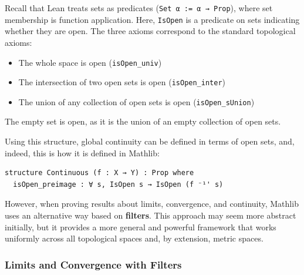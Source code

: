 Recall that Lean treats sets as predicates
(\lstinline[language=lean]|Set α := α → Prop|),
where set membership is function application.
Here, \lstinline[language=lean]|IsOpen| is a predicate on sets indicating whether
they are open. The three axioms correspond to the standard topological axioms:
\begin{itemize}
    \item The whole space is open (\lstinline[language=lean]|isOpen_univ|)
    \item The intersection of two open sets is open (\lstinline[language=lean]|isOpen_inter|)
    \item The union of any collection of open sets is open (\lstinline[language=lean]|isOpen_sUnion|)
\end{itemize}
\begin{note}
    The empty set is open, as it is the union of an empty collection of open sets.
\end{note}
Using this structure, global continuity can be defined in terms
of open sets, and, indeed, this is how it is defined in Mathlib:
\begin{lstlisting}[language=lean]
structure Continuous (f : X → Y) : Prop where
  isOpen_preimage : ∀ s, IsOpen s → IsOpen (f ⁻¹' s)
\end{lstlisting}
However, when proving results about limits, convergence, and continuity,
Mathlib uses an alternative way based on \textbf{filters}.
This approach may seem more abstract initially, but it provides
a more general and powerful framework that works uniformly
across all topological spaces and, by extension, metric spaces.

\subsubsection{Limits and Convergence with Filters}

